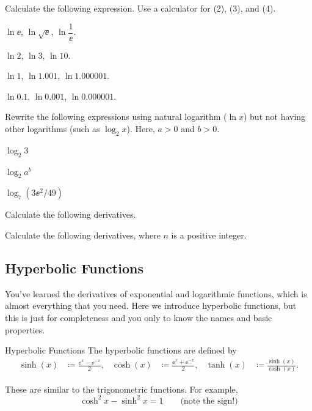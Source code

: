 \documentclass[11pt,pdfa,lastpage]{MishoNote}
\begin{document}
\begin{enumerate}[resume]
 \itemA Calculate the following expression. Use a calculator for (2), (3), and (4).
 \begin{menumerate}{2}
\item $\ln \ee$, $\ln \sqrt{\ee}$, $\ln \dfrac{1}{\ee}$.
\item $\ln 2$, $\ln 3$, $\ln 10$.
\item $\ln 1$, $\ln 1.001$, $\ln 1.000001$.
\item $\ln 0.1$, $\ln 0.001$, $\ln 0.000001$.
 \end{menumerate}
\itemB Rewrite the following expressions using natural logarithm ($\ln x$) but not having other logarithms (such as $\log_2 x$). Here, $a>0$ and $b>0$.
\begin{menumerate}{3}
  \item $\log_2 3$
  \item $\log_2a^b$
  \item $\log_7(3\ee^2/49)$
\end{menumerate}
  \itemS Calculate the following derivatives.
  \begin{menumerate}{4}
  \end{menumerate}
  \itemB Calculate the following derivatives, where $n$ is a positive integer.
  \begin{menumerate}{3}
\end{menumerate}
\end{enumerate}

\newpage

\subsection{Hyperbolic Functions}
You've learned the derivatives of exponential and logarithmic functions, which is almost everything that you need.
Here we introduce hyperbolic functions, but this is just for completeness and you only to know the names and basic properties.
\begin{definition}{Hyperbolic Functions}{}
  The hyperbolic functions are defined by
  \begin{align}
    \sinh(x) &\coloneq \frac{\ee^x-\ee^{-x}}{2},&
    \cosh(x) &\coloneq \frac{\ee^x+\ee^{-x}}{2},&
    \tanh(x) &\coloneq \frac{\sinh(x)}{\cosh(x)}.
  \end{align}
\end{definition}
These are similar to the trigonometric functions. For example,
\[ \cosh^2x-\sinh^2x=1 \qquad\text{(note the sign!)} \]
\end{document}

